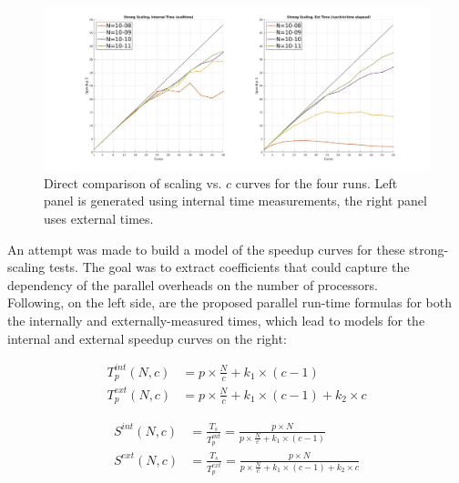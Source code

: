 \documentclass{article}
\begin{document}
\begin{center}
\begin{figure}[h]
\includegraphics[width=1\textwidth]{strong_scaling2_noerror}
\caption{Direct comparison of scaling vs. $c$ curves for the four runs. Left panel is generated using internal time measurements, the right panel uses external times.}
\end{figure}
\label{strong_scaling2}
\end{center}																		
An attempt was made to build a model of the speedup curves for these strong-scaling tests. The goal was to extract coefficients that could capture the dependency of the parallel overheads on the number of processors.\\
Following, on the left side, are the proposed parallel run-time formulas for both the internally and externally-measured times, which lead to models for the internal and external speedup curves on the right:





\begin{minipage}{0.5\linewidth}
\begin{equation*}
\begin{split}
T_p^{int} \left( N, c \right) &= p \times \frac{N}{c} + k_1 \times \left( c - 1 \right) \\
T_p^{ext} \left( N, c \right) &= p \times \frac{N}{c} + k_1 \times \left( c - 1 \right) + k_2 \times c 
\end{split}
\end{equation*}
\end{minipage}
\begin{minipage}{0.5\linewidth}
\begin{equation}\label{speedup_model}
\begin{split}
S^{int} \left( N, c \right) &= \frac{T_s}{T_p^{int}} =  \frac{p\times N}{p \times \frac{N}{c} + k_1 \times \left( c - 1 \right)} \\
S^{ext} \left( N, c \right) &= \frac{T_s}{T_p^{ext}} = \frac{p\times N}{p \times \frac{N}{c} + k_1 \times \left( c - 1 \right) + k_2 \times c} 
\end{split}
\end{equation}
\end{minipage}
\end{document}
